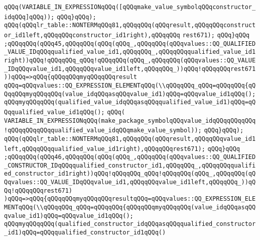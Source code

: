 \verb|qQQq(VARIABLE_IN_EXPRESSIONqQQq([qQQqmake_value_symbolqQQqconstructor_idqQQq]qQQq));|\newline
\verb|qQQq}qQQq);|\newline
\verb|qQQq(qQQqlr_table::NONTERMqQQq81,qQQqqQQq(qQQqresult,qQQqqQQqconstructor_id1left,qQQqqQQqconstructor_id1right),qQQqqQQq|\newline
\verb|rest671);|\newline
\verb|qQQq}qQQq|\newline
\verb|;qQQqqQQq(qQQq45,qQQqqQQq(qQQq(qQQq_,qQQqqQQq(qQQqvalues::QQ_QUALIFIED_VALUE_IDqQQqqualified_value_id1,qQQqqQQq_,qQQqqQQqqualified_value_id1right))qQQq!qQQqqQQq_qQQq!qQQqqQQq(qQQq_,qQQqqQQq(qQQqvalues::QQ_VALUE_IDqQQqvalue_id1,qQQqqQQqvalue_id1left,qQQqqQQq_))qQQq!qQQqqQQqrest671))qQQq=>qQQq{qQQqqQQqmyqQQqqQQqresult|\newline
\verb|qQQq=qQQqvalues::QQ_EXPRESSION_ELEMENTqQQq(\\qQQqqQQq_qQQq=qQQqqQQq{qQQqqQQqmyqQQqqQQq(value_idqQQqasqQQqvalue_id1)qQQq=qQQqvalue_id1qQQq();|\newline
\verb|qQQqmyqQQqqQQq(qualified_value_idqQQqasqQQqqualified_value_id1)qQQq=qQQqqualified_value_id1qQQq();|\newline
\verb|qQQq(|\newline
\verb|VARIABLE_IN_EXPRESSIONqQQq(make_package_symbolqQQqvalue_idqQQqqQQqqQQq!qQQqqQQqqQQqqualified_value_idqQQqmake_value_symbol));|\newline
\verb|qQQq}qQQq);|\newline
\verb|qQQq(qQQqlr_table::NONTERMqQQq81,qQQqqQQq(qQQqresult,qQQqqQQqvalue_id1left,qQQqqQQqqualified_value_id1right),qQQqqQQqrest671);|\newline
\verb|qQQq}qQQq|\newline
\verb|;qQQqqQQq(qQQq46,qQQqqQQq(qQQq(qQQq_,qQQqqQQq(qQQqvalues::QQ_QUALIFIED_CONSTRUCTOR_IDqQQqqualified_constructor_id1,qQQqqQQq_,qQQqqQQqqualified_constructor_id1right))qQQq!qQQqqQQq_qQQq!qQQqqQQq(qQQq_,qQQqqQQq(qQQqvalues::QQ_VALUE_IDqQQqvalue_id1,qQQqqQQqvalue_id1left,qQQqqQQq_))qQQq!qQQqqQQqrest671)|\newline
\verb|)qQQq=>qQQq{qQQqqQQqmyqQQqqQQqresultqQQq=qQQqvalues::QQ_EXPRESSION_ELEMENTqQQq(\\qQQqqQQq_qQQq=qQQqqQQq{qQQqqQQqmyqQQqqQQq(value_idqQQqasqQQqvalue_id1)qQQq=qQQqvalue_id1qQQq();|\newline
\verb|qQQqmyqQQqqQQq(qualified_constructor_idqQQqasqQQqqualified_constructor_id1)qQQq=qQQqqualified_constructor_id1qQQq()|\newline
